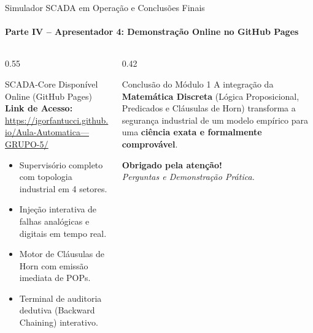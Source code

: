 \documentclass[aspectratio=169, 10pt]{beamer}
\begin{document}
\begin{frame}{Simulador SCADA em Operação e Conclusões Finais}
  \framesubtitle{Parte IV -- Apresentador 4: Demonstração Online no GitHub Pages}
  \begin{columns}
    \begin{column}{0.55\textwidth}
      \begin{block}{SCADA-Core Disponível Online (GitHub Pages)}
        \textbf{Link de Acesso:}
        \href{https://igorfantucci.github.io/Aula-Automatica---GRUPO-5/}{\textcolor{accentblue}{\underline{https://igorfantucci.github.io/Aula-Automatica---GRUPO-5/}}}
        \begin{itemize}
          \item Supervisório completo com topologia industrial em 4 setores.
          \item Injeção interativa de falhas analógicas e digitais em tempo real.
          \item Motor de Cláusulas de Horn com emissão imediata de POPs.
          \item Terminal de auditoria dedutiva (Backward Chaining) interativo.
        \end{itemize}
      \end{block}
    \end{column}

    \begin{column}{0.42\textwidth}
      \begin{exampleblock}{Conclusão do Módulo 1}
        A integração da \textbf{Matemática Discreta} (Lógica Proposicional, Predicados e Cláusulas de Horn) transforma a segurança industrial de um modelo empírico para uma \textbf{ciência exata e formalmente comprovável}.
      \end{exampleblock}
      \vspace{0.2cm}
      \centering
      \textbf{Obrigado pela atenção!}\\
      \textit{Perguntas e Demonstração Prática.}
    \end{column}
  \end{columns}
\end{frame}
\end{document}

